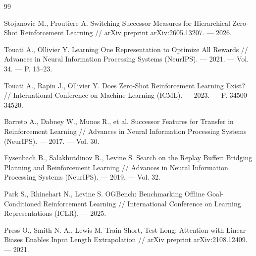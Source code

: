 \begin{thebibliography}{99}

Stojanovic M., Proutiere A. Switching Successor Measures for Hierarchical Zero-Shot Reinforcement Learning // arXiv preprint arXiv:2605.13207. --- 2026.

Touati A., Ollivier Y. Learning One Representation to Optimize All Rewards // Advances in Neural Information Processing Systems (NeurIPS). --- 2021. --- Vol. 34. --- P. 13--23.

Touati A., Rapin J., Ollivier Y. Does Zero-Shot Reinforcement Learning Exist? // International Conference on Machine Learning (ICML). --- 2023. --- P. 34500--34520.

Barreto A., Dabney W., Munos R., et al. Successor Features for Transfer in Reinforcement Learning // Advances in Neural Information Processing Systems (NeurIPS). --- 2017. --- Vol. 30.

Eysenbach B., Salakhutdinov R., Levine S. Search on the Replay Buffer: Bridging Planning and Reinforcement Learning // Advances in Neural Information Processing Systems (NeurIPS). --- 2019. --- Vol. 32.

Park S., Rhinehart N., Levine S. OGBench: Benchmarking Offline Goal-Conditioned Reinforcement Learning // International Conference on Learning Representations (ICLR). --- 2025.

Press O., Smith N. A., Lewis M. Train Short, Test Long: Attention with Linear Biases Enables Input Length Extrapolation // arXiv preprint arXiv:2108.12409. --- 2021.

\end{thebibliography}
